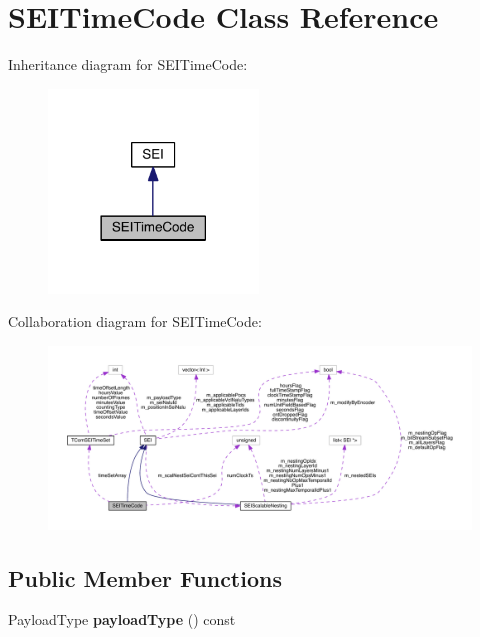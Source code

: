 \hypertarget{class_s_e_i_time_code}{}\section{S\+E\+I\+Time\+Code Class Reference}
\label{class_s_e_i_time_code}


Inheritance diagram for S\+E\+I\+Time\+Code\+:
\nopagebreak
\begin{figure}[H]
\begin{center}
\leavevmode
\includegraphics[width=158pt]{d1/dbb/class_s_e_i_time_code__inherit__graph}
\end{center}
\end{figure}


Collaboration diagram for S\+E\+I\+Time\+Code\+:
\nopagebreak
\begin{figure}[H]
\begin{center}
\leavevmode
\includegraphics[width=350pt]{d9/db9/class_s_e_i_time_code__coll__graph}
\end{center}
\end{figure}
\subsection*{Public Member Functions}
\begin{DoxyCompactItemize}
\item 
\mbox{\label{class_s_e_i_time_code_a7dec9efe4086a80f27bd63a13296c0b0}} 
Payload\+Type {\bfseries payload\+Type} () const
\end{DoxyCompactItemize}
